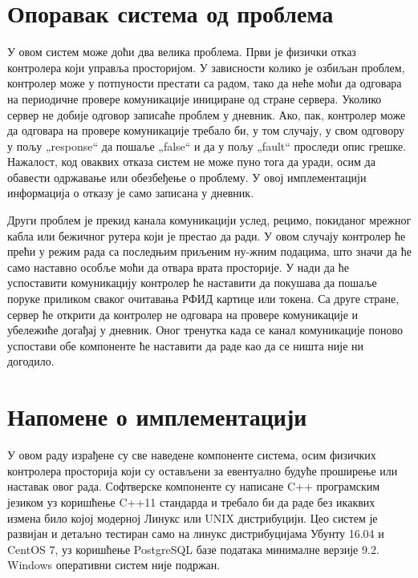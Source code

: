 \documentclass[a4paper, 12pt, diplomski]{etfcyr}
\def\quote#1{„#1“}
\begin{document}
		\section{Опоравак система од проблема}
			\begin{justify}
				У овом систем може доћи два велика проблема. Први је физички отказ контролера који управља просторијом. У зависности колико је озбиљан проблем, контролер може у потпуности престати са радом, тако да неће моћи да одговара на периодичне провере комуникације инициране од стране сервера. Уколико сервер не добије одговор записаће проблем у дневник. Ако, пак, контролер може да одговара на провере комуникације требало би, у том случају, у свом одговору у пољу \quote{response} да пошаље \quote{false} и да у пољу \quote{fault} проследи опис грешке. Нажалост, код оваквих отказа систем не може пуно тога да уради, осим да обавести одржавање или обезбеђење о проблему. У овој имплементацији информација о отказу је само записана у дневник.

				Други проблем је прекид канала комуникацији услед, рецимо, покиданог мрежног кабла или бежичног рутера који је престао да ради. У овом случају контролер ће прећи у режим рада са последњим приљеним ну-жним подацима, што значи да ће само наставно особље моћи да отвара врата просторије. У нади да ће успоставити комуникацију контролер ће наставити да покушава да пошаље поруке приликом сваког очитавања РФИД картице или токена. Са друге стране, сервер ће открити да контролер не одговара на провере комуникације и убележиће догађај у дневник. Оног тренутка када се канал комуникације поново успостави обе компоненте ће наставити да раде као да се ништа није ни догодило.
			\end{justify}

		\section{Напомене о имплементацији}
			\begin{justify}
				У овом раду израђене су све наведене компоненте система, осим физичких контролера просторија који су остављени за евентуално будуће проширење или наставак овог рада. Софтверске компоненте су написане C++ програмским језиком уз коришћење C++11 стандарда и требало би да раде без икаквих измена било којој модерној Линукс или UNIX дистрибуцији. Цео систем је развијан и детаљно тестиран само на линукс дистрибуцијама Убунту 16.04 и CentOS 7, уз коришћење PostgreSQL базе података минималне верзије 9.2. Windows оперативни систем није подржан.
			\end{justify}
\end{document}

